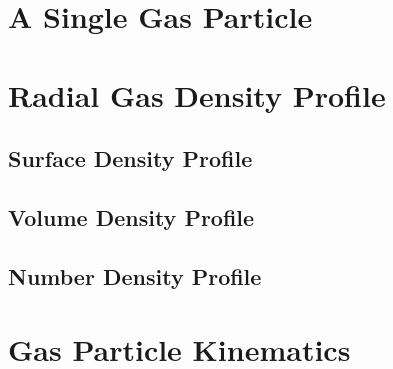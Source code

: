 
\section{A Single Gas Particle}
\section{Radial Gas Density Profile}
    \subsection{Surface Density Profile}
    \subsection{Volume Density Profile}
    \subsection{Number Density Profile}
\section{Gas Particle Kinematics}
